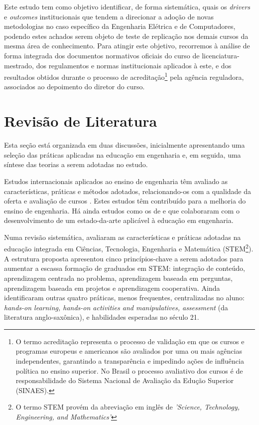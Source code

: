 \documentclass{textolivre}
\begin{document}
Este estudo tem como objetivo identificar, de forma sistemática, quais os \textit{drivers} e \textit{outcomes} institucionais que tendem a direcionar a adoção de novas metodologias no caso específico da Engenharia Elétrica e de Computadores, podendo estes achados serem objeto de teste de replicação nos demais cursos da mesma área de conhecimento. Para atingir este objetivo, recorremos à análise de forma integrada dos documentos normativos oficiais do curso de licenciatura-mestrado, dos regulamentos e normas institucionais aplicados à este, e dos resultados obtidos durante o processo de acreditação\footnote{O termo acreditação representa o processo de validação em que os cursos e programas europeus e americanos são avaliados por uma ou mais agências independentes, garantindo a transparência e impedindo ações de influência política no ensino superior. No Brasil o processo avaliativo dos cursos é de responsabilidade do Sistema Nacional de Avaliação da Edução Superior (SINAES).} pela agência reguladora, associados ao depoimento do diretor do curso.

\section{Revisão de Literatura}\label{sec-revisao}
Esta seção está organizada em duas discussões, inicialmente apresentando uma seleção das práticas aplicadas na educação em engenharia e, em seguida, uma síntese das teorias a serem adotadas no estudo.

Estudos internacionais aplicados ao ensino de engenharia têm avaliado as características, práticas e métodos adotados, relacionando-os com a qualidade da oferta e avaliação de cursos \cite{eldin2018,li2020,thibaut2018}. Estes estudos têm contribuído para a melhoria do ensino de engenharia. Há ainda estudos como os de \textcite{graham2018} e \textcite{manzoor2017} que colaboraram com o desenvolvimento de um estado-da-arte aplicável à educação em engenharia.

Numa revisão sistemática, \cite{thibaut2018} avaliaram as características e práticas adotadas na educação integrada em Ciências, Tecnologia, Engenharia e Matemática (STEM\footnote{O termo STEM provém da abreviação em inglês de \textit{'Science, Technology, Engineering, and Mathematics'}}). A estrutura proposta apresentou cinco princípios-chave a serem adotados para aumentar a escassa formação de graduados em STEM: integração de conteúdo, aprendizagem centrada no problema, aprendizagem baseada em perguntas, aprendizagem baseada em projetos e aprendizagem cooperativa. Ainda identificaram outras quatro práticas, menos frequentes, centralizadas no aluno: \textit{hands-on learning, hands-on activities and manipulatives, assessment} (da literatura anglo-saxônica), e habilidades esperadas no século 21.
\end{document}
